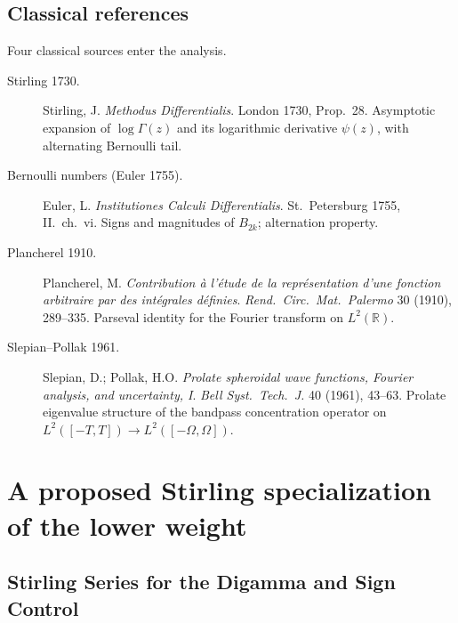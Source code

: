 \subsection{Classical references}
\label{v4-arith:w7-e:sources}

Four classical sources enter the analysis.

\begin{description}
\item[Stirling 1730.] Stirling, J. \emph{Methodus Differentialis}.
London 1730, Prop.~28. Asymptotic expansion of \(\log\Gamma(z)\) and
its logarithmic derivative \(\psi(z)\), with alternating Bernoulli
tail.
\item[Bernoulli numbers (Euler 1755).] Euler, L. \emph{Institutiones
Calculi Differentialis}. St.\ Petersburg 1755, II.\ ch.~vi. Signs
and magnitudes of \(B_{2k}\); alternation property.
\item[Plancherel 1910.] Plancherel, M. \emph{Contribution \`a l'\'etude
de la repr\'esentation d'une fonction arbitraire par des int\'egrales
d\'efinies}. \emph{Rend.~Circ.~Mat.~Palermo} 30 (1910), 289--335.
Parseval identity for the Fourier transform on \(L^{2}(\mathbb{R})\).
\item[Slepian--Pollak 1961.] Slepian, D.; Pollak, H.O. \emph{Prolate
spheroidal wave functions, Fourier analysis, and uncertainty, I}.
\emph{Bell Syst.~Tech.~J.} 40 (1961), 43--63. Prolate eigenvalue
structure of the bandpass concentration operator on
\(L^{2}([-T,T])\to L^{2}([-\Omega,\Omega])\).
\end{description}

\section{A proposed Stirling specialization of the lower weight}
\label{v4-arith:w7-e:stirling-lower-bound}

\subsection{Stirling Series for the Digamma and Sign Control}
\label{v4-arith:w7-e:stirling}

